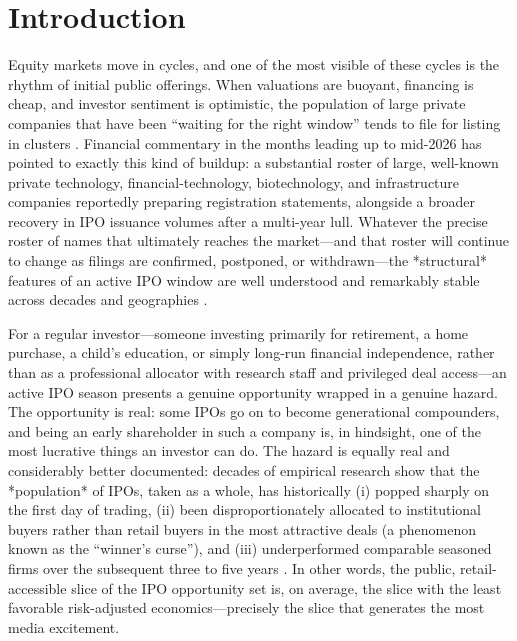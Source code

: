 \documentclass[conference]{IEEEtran}
\begin{document}
\section{Introduction}
\label{sec:intro}

Equity markets move in cycles, and one of the most visible of these cycles is the rhythm of initial public offerings. When valuations are buoyant, financing is cheap, and investor sentiment is optimistic, the population of large private companies that have been ``waiting for the right window'' tends to file for listing in clusters \cite{lucasmcdonald1990}. Financial commentary in the months leading up to mid-2026 has pointed to exactly this kind of buildup: a substantial roster of large, well-known private technology, financial-technology, biotechnology, and infrastructure companies reportedly preparing registration statements, alongside a broader recovery in IPO issuance volumes after a multi-year lull. Whatever the precise roster of names that ultimately reaches the market---and that roster will continue to change as filings are confirmed, postponed, or withdrawn---the *structural* features of an active IPO window are well understood and remarkably stable across decades and geographies \cite{ritter1991, loughranritter2004}.

For a regular investor---someone investing primarily for retirement, a home purchase, a child's education, or simply long-run financial independence, rather than as a professional allocator with research staff and privileged deal access---an active IPO season presents a genuine opportunity wrapped in a genuine hazard. The opportunity is real: some IPOs go on to become generational compounders, and being an early shareholder in such a company is, in hindsight, one of the most lucrative things an investor can do. The hazard is equally real and considerably better documented: decades of empirical research show that the *population* of IPOs, taken as a whole, has historically (i) popped sharply on the first day of trading, (ii) been disproportionately allocated to institutional buyers rather than retail buyers in the most attractive deals (a phenomenon known as the ``winner's curse''), and (iii) underperformed comparable seasoned firms over the subsequent three to five years \cite{ibbotson1975, rock1986, loughranritter1995}. In other words, the public, retail-accessible slice of the IPO opportunity set is, on average, the slice with the least favorable risk-adjusted economics---precisely the slice that generates the most media excitement.
\end{document}
